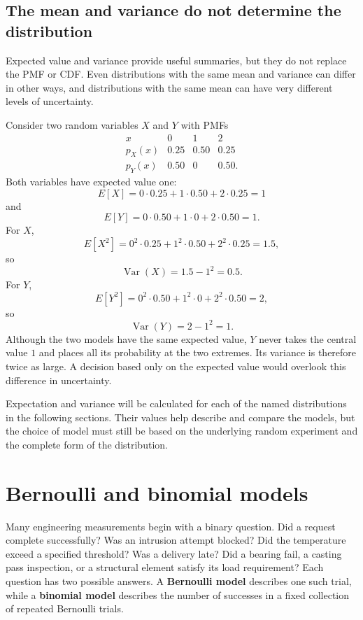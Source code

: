 \subsection{The mean and variance do not determine the distribution}

Expected value and variance provide useful summaries, but they do not replace the PMF or CDF. Even distributions with the same mean and variance can differ in other ways, and distributions with the same mean can have very different levels of uncertainty.

\begin{example}\par
Consider two random variables $X$ and $Y$ with PMFs
\[
\begin{array}{c|ccc}
x & 0 & 1 & 2\\ \hline
p_X(x) & 0.25 & 0.50 & 0.25\\
p_Y(x) & 0.50 & 0 & 0.50.
\end{array}
\]
Both variables have expected value one:
\[
E[X]=0\cdot0.25+1\cdot0.50+2\cdot0.25=1
\]
and
\[
E[Y]=0\cdot0.50+1\cdot0+2\cdot0.50=1.
\]
For $X$,
\[
E[X^2]=0^2\cdot0.25+1^2\cdot0.50+2^2\cdot0.25=1.5,
\]
so
\[
\operatorname{Var}(X)=1.5-1^2=0.5.
\]
For $Y$,
\[
E[Y^2]=0^2\cdot0.50+1^2\cdot0+2^2\cdot0.50=2,
\]
so
\[
\operatorname{Var}(Y)=2-1^2=1.
\]
Although the two models have the same expected value, $Y$ never takes the central value $1$ and places all its probability at the two extremes. Its variance is therefore twice as large. A decision based only on the expected value would overlook this difference in uncertainty.
\end{example}

Expectation and variance will be calculated for each of the named distributions in the following sections. Their values help describe and compare the models, but the choice of model must still be based on the underlying random experiment and the complete form of the distribution.

\clearpage
\section{Bernoulli and binomial models}
\label{sec:bernoulli-binomial-models}

Many engineering measurements begin with a binary question. Did a request complete successfully? Was an intrusion attempt blocked? Did the temperature exceed a specified threshold? Was a delivery late? Did a bearing fail, a casting pass inspection, or a structural element satisfy its load requirement? Each question has two possible answers. A \textbf{Bernoulli model} describes one such trial, while a \textbf{binomial model} describes the number of successes in a fixed collection of repeated Bernoulli trials.

